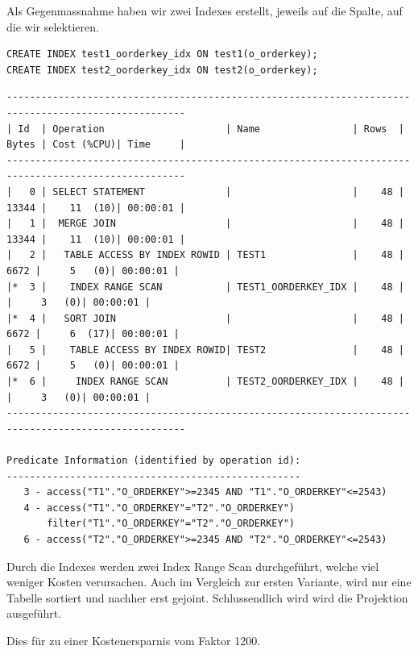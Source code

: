 \documentclass[10pt]{article}
\begin{document}
Als Gegenmassnahme haben wir zwei Indexes erstellt, jeweils auf die Spalte, auf 
die wir selektieren. 
\begin{lstlisting}[style=sql]
CREATE INDEX test1_oorderkey_idx ON test1(o_orderkey);
CREATE INDEX test2_oorderkey_idx ON test2(o_orderkey);
\end{lstlisting}
\begin{lstlisting}[style=queryexecutionplanSmall]
-----------------------------------------------------------------------------------------------------
| Id  | Operation                     | Name                | Rows  | Bytes | Cost (%CPU)| Time     |
-----------------------------------------------------------------------------------------------------
|   0 | SELECT STATEMENT              |                     |    48 | 13344 |    11  (10)| 00:00:01 |
|   1 |  MERGE JOIN                   |                     |    48 | 13344 |    11  (10)| 00:00:01 |
|   2 |   TABLE ACCESS BY INDEX ROWID | TEST1               |    48 |  6672 |     5   (0)| 00:00:01 |
|*  3 |    INDEX RANGE SCAN           | TEST1_OORDERKEY_IDX |    48 |       |     3   (0)| 00:00:01 |
|*  4 |   SORT JOIN                   |                     |    48 |  6672 |     6  (17)| 00:00:01 |
|   5 |    TABLE ACCESS BY INDEX ROWID| TEST2               |    48 |  6672 |     5   (0)| 00:00:01 |
|*  6 |     INDEX RANGE SCAN          | TEST2_OORDERKEY_IDX |    48 |       |     3   (0)| 00:00:01 |
-----------------------------------------------------------------------------------------------------
 
Predicate Information (identified by operation id):
---------------------------------------------------
   3 - access("T1"."O_ORDERKEY">=2345 AND "T1"."O_ORDERKEY"<=2543)
   4 - access("T1"."O_ORDERKEY"="T2"."O_ORDERKEY")
       filter("T1"."O_ORDERKEY"="T2"."O_ORDERKEY")
   6 - access("T2"."O_ORDERKEY">=2345 AND "T2"."O_ORDERKEY"<=2543)
\end{lstlisting}
Durch die Indexes werden zwei Index Range Scan durchgeführt, welche viel weniger Kosten verursachen. 
Auch im Vergleich zur ersten Variante, wird nur eine Tabelle sortiert und nachher erst gejoint. 
Schlussendlich wird wird die Projektion ausgeführt.

Dies für zu einer Kostenersparnis vom Faktor 1200.
\end{document}
